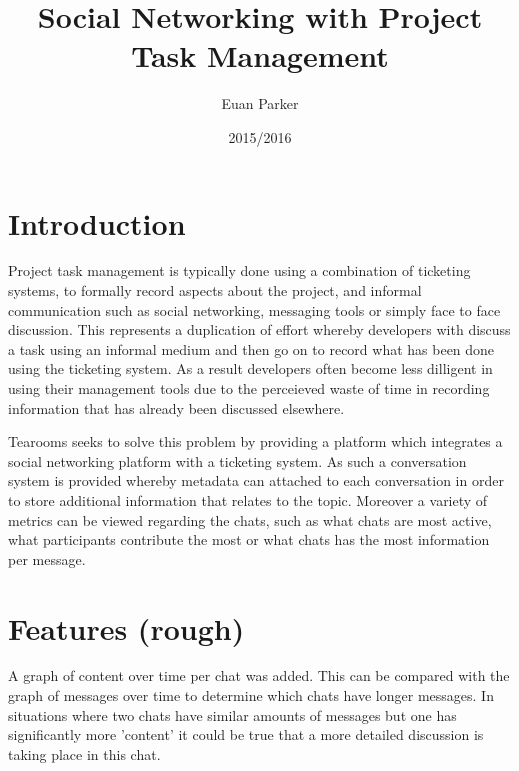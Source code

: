 \documentclass{l4proj}
\begin{document}
\title{Social Networking with Project Task Management}
\author{Euan Parker}
\date{2015/2016}
\maketitle

\begin{abstract}

\end{abstract}

\educationalconsent
%
%
\tableofcontents

\chapter{Introduction}

Project task management is typically done using a combination of ticketing systems, to formally record aspects about the project, and informal communication such as social networking, messaging tools or simply face to face discussion. This represents a duplication of effort whereby developers with discuss a task using an informal medium and then go on to record what has been done using the ticketing system.  As a result developers often become less dilligent in using their management tools due to the perceieved waste of time in recording information that has already been discussed elsewhere. 

Tearooms seeks to solve this problem by providing a platform which integrates a social networking platform with a ticketing system.  As such a conversation system is provided whereby metadata can attached to each conversation in order to store additional information that relates to the topic.  Moreover a variety of metrics can be viewed regarding the chats, such as what chats are most active, what participants contribute the most or what chats has the most information per message.


\chapter{Features (rough)}

A graph of content over time per chat was added.  This can be compared with the graph of messages over time to determine which chats have longer messages.  In situations where two chats have similar amounts of messages but one has significantly more 'content' it could be true that a more detailed discussion is taking place in this chat.
\end{document}
